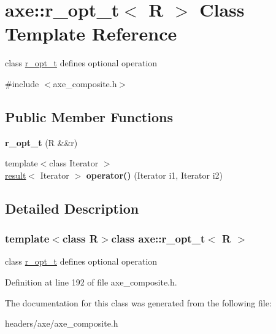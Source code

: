 \hypertarget{classaxe_1_1r__opt__t}{\section{axe\+:\+:r\+\_\+opt\+\_\+t$<$ R $>$ Class Template Reference}
\label{classaxe_1_1r__opt__t}
}


class \hyperlink{classaxe_1_1r__opt__t}{r\+\_\+opt\+\_\+t} defines optional operation  




{\ttfamily \#include $<$axe\+\_\+composite.\+h$>$}

\subsection*{Public Member Functions}
\begin{DoxyCompactItemize}
\item 
\hypertarget{classaxe_1_1r__opt__t_ad70a66089da54f1e9fb77df86940cb34}{{\bfseries r\+\_\+opt\+\_\+t} (R \&\&r)}\label{classaxe_1_1r__opt__t_ad70a66089da54f1e9fb77df86940cb34}

\item 
\hypertarget{classaxe_1_1r__opt__t_af8390d9b0cdc332446b1f3332e4c9bf7}{{\footnotesize template$<$class Iterator $>$ }\\\hyperlink{structaxe_1_1result}{result}$<$ Iterator $>$ {\bfseries operator()} (Iterator i1, Iterator i2)}\label{classaxe_1_1r__opt__t_af8390d9b0cdc332446b1f3332e4c9bf7}

\end{DoxyCompactItemize}


\subsection{Detailed Description}
\subsubsection*{template$<$class R$>$class axe\+::r\+\_\+opt\+\_\+t$<$ R $>$}

class \hyperlink{classaxe_1_1r__opt__t}{r\+\_\+opt\+\_\+t} defines optional operation 

Definition at line 192 of file axe\+\_\+composite.\+h.



The documentation for this class was generated from the following file\+:\begin{DoxyCompactItemize}
\item 
headers/axe/axe\+\_\+composite.\+h\end{DoxyCompactItemize}
